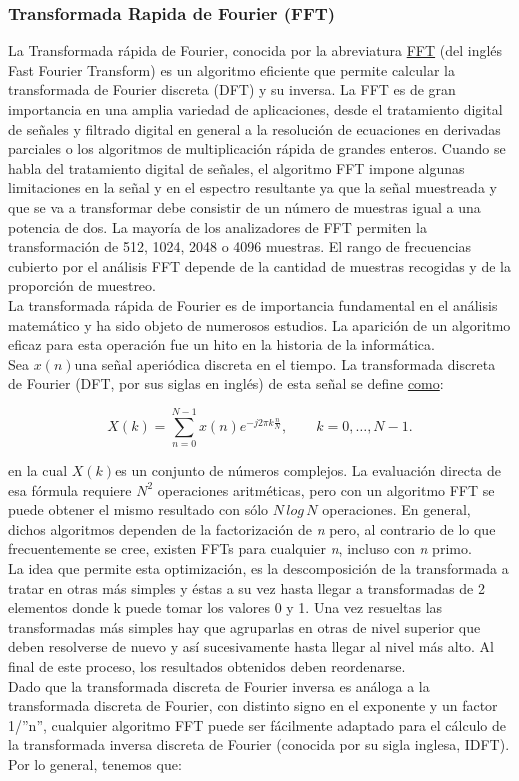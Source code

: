 \documentclass[a4paper]{article}
\begin{document}
\subsubsection{Transformada Rapida de Fourier (FFT)}

La Transformada rápida de Fourier, conocida por la abreviatura \href{https://es.wikipedia.org/wiki/Transformada_r\%C3\%A1pida_de_Fourier}{FFT} (del inglés Fast Fourier Transform) es un algoritmo eficiente que permite calcular la transformada de Fourier discreta (DFT) y su inversa. La FFT es de gran importancia en una amplia variedad de aplicaciones, desde el tratamiento digital de señales y filtrado digital en general a la resolución de ecuaciones en derivadas parciales o los algoritmos de multiplicación rápida de grandes enteros. Cuando se habla del tratamiento digital de señales, el algoritmo FFT impone algunas limitaciones en la señal y en el espectro resultante ya que la señal muestreada y que se va a transformar debe consistir de un número de muestras igual a una potencia de dos. La mayoría de los analizadores de FFT permiten la transformación de 512, 1024, 2048 o 4096 muestras. El rango de frecuencias cubierto por el análisis FFT depende de la cantidad de muestras recogidas y de la proporción de muestreo.
\\
La transformada rápida de Fourier es de importancia fundamental en el análisis matemático y ha sido objeto de numerosos estudios. La aparición de un algoritmo eficaz para esta operación fue un hito en la historia de la informática.
\\
Sea $x(n)$una señal aperiódica discreta en el tiempo. La transformada discreta de Fourier (DFT, por sus siglas en inglés) de esta señal se define \href{https://engineering.purdue.edu/~ee538/DSP_Text_3rdEdition.pdf}{como}:

\[{\displaystyle X(k)=\sum _{n=0}^{N-1}x(n)e^{-{j2\pi k{\frac {n}{N}}}},\qquad k=0,\dots ,N-1.}\]

en la cual $ X(k) $es un conjunto de números complejos. La evaluación directa de esa fórmula requiere $N^2$ operaciones aritméticas, pero con un algoritmo FFT se puede obtener el mismo resultado con sólo $N\,log \,N$ operaciones. En general, dichos algoritmos dependen de la factorización de \textit{n} pero, al contrario de lo que frecuentemente se cree, existen FFTs para cualquier \textit{n}, incluso con \textit{n} primo.
\\
La idea que permite esta optimización, es la descomposición de la transformada a tratar en otras más simples y éstas a su vez hasta llegar a transformadas de 2 elementos donde k puede tomar los valores 0 y 1. Una vez resueltas las transformadas más simples hay que agruparlas en otras de nivel superior que deben resolverse de nuevo y así sucesivamente hasta llegar al nivel más alto. Al final de este proceso, los resultados obtenidos deben reordenarse.
\\
Dado que la transformada discreta de Fourier inversa es análoga a la transformada discreta de Fourier, con distinto signo en el exponente y un factor 1/''n'', cualquier algoritmo FFT puede ser fácilmente adaptado para el cálculo de la transformada inversa discreta de Fourier (conocida por su sigla inglesa, IDFT). Por lo general, tenemos que:
		
\end{document}
